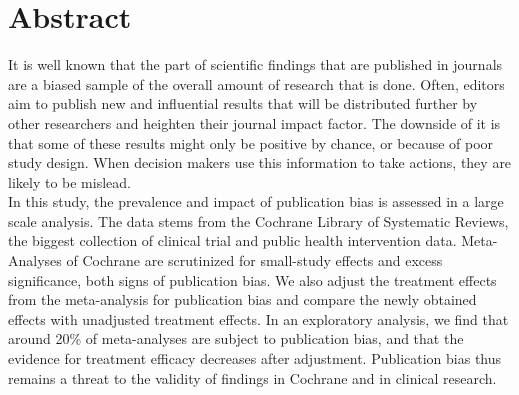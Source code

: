 \documentclass[11pt,a4paper,twoside]{book}\usepackage[]{graphicx}\usepackage[]{color}
\begin{document}





\graphicspath{{./figure/}}
\setcounter{tocdepth}{1}



\thispagestyle{empty}
\newpage


\chapter*{Abstract}
\thispagestyle{plain}
It is well known that the part of scientific findings that are published in journals are a 
biased sample of the overall amount of research that is done. Often, editors aim to publish
new and influential results that will be distributed further by other researchers and
heighten their journal impact factor. The downside of it is that some of these results
might only be positive by chance, or because of poor study design. When decision
makers use this information to take actions, they are likely to be mislead. \\
In this study, the prevalence and impact of publication bias is assessed in 
a large scale analysis. The data stems from the Cochrane Library of Systematic Reviews, the biggest collection
of clinical trial and public health intervention data. Meta-Analyses of Cochrane
are scrutinized for small-study effects and excess significance, both signs
of publication bias. We also adjust the treatment effects from the meta-analysis for publication bias 
and compare the newly obtained effects with unadjusted treatment effects. In an exploratory analysis, we find
that around 20\% of meta-analyses are subject to publication bias, and that the
evidence for treatment efficacy decreases after adjustment. Publication bias
thus remains a threat to the validity of findings in Cochrane and in clinical research.
\end{document}
